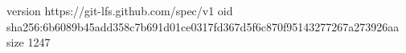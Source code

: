 version https://git-lfs.github.com/spec/v1
oid sha256:6b6089b45add358c7b691d01ce0317fd367d5f6c870f95143277267a273926aa
size 1247
